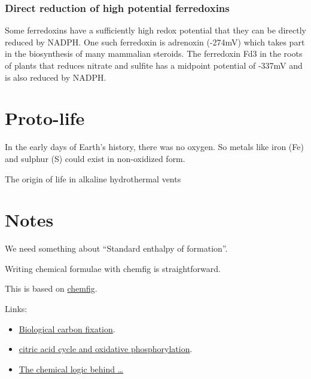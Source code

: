 \documentclass{article}
\begin{document}
\subsubsection{Direct reduction of high potential ferredoxins}
Some ferredoxins have a sufficiently high redox potential that they can be directly
reduced by NADPH\@. One such ferredoxin is adrenoxin (-274mV) which takes part in the
biosynthesis of many mammalian steroids.  The ferredoxin Fd3 in the roots of plants that
reduces nitrate and sulfite has a midpoint potential of -337mV and is also reduced by
NADPH\@.

\section{Proto-life}
In the early days of Earth's history, there was no oxygen. So metals like iron (Fe) and
sulphur (S) could exist in non-oxidized form.

The origin of life in alkaline hydrothermal vents


\pagebreak
\section{Notes}\label{sec_notes}

We need something about ``Standard enthalpy of formation''.

Writing chemical formulae with chemfig is straightforward.

This is based on \href{https://www.overleaf.com/learn/latex/Chemistry_formulae}{chemfig}.

Links:
\begin{itemize}
    \item\href{https://en.wikipedia.org/wiki/Biological_carbon_fixation}{Biological carbon fixation}.
    \item\href{https://courses.lumenlearning.com/wm-nmbiology1/chapter/citric-acid-cycle-and-oxidative-phosphorylation/}{citric
        acid cycle and oxidative phosphorylation}.
    \item\href{http://homepage.ufp.pt/pedros/bq/tca.htm}{The chemical logic behind \ldots}
\end{itemize}
\end{document}
